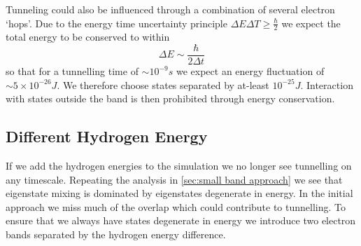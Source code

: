Tunneling could also be
influenced
through a combination of
several electron `hops'.
Due to the energy time uncertainty
principle \(\Delta{}E\Delta{}T \geq \frac{\hbar}{2}\)
we expect the total energy to be conserved
to within
\begin{equation}
    \Delta{}E \sim \frac{\hbar}{2\Delta{} t}
\end{equation}
so that for a tunnelling time of
\(\sim 10^{-9}s\)
we expect an energy fluctuation
of \(\sim 5\times{}10^{-26} J\).
We therefore choose states separated
by at-least \(10^{-25} J\).
Interaction with states outside
the band is then prohibited
through energy conservation.


\subsection{Different Hydrogen Energy}\label{sec:different hydrogen energy}
If we add the hydrogen energies to the
simulation we no longer see tunnelling
on any timescale. Repeating the analysis
in \cref{sec:small band approach} we
see that eigenstate mixing
is dominated by
eigenstates degenerate in energy.
In the initial approach we
miss much of the overlap which could
contribute to tunnelling. To ensure that we always have
states degenerate in energy we
introduce two electron
bands separated by the hydrogen energy
difference.
